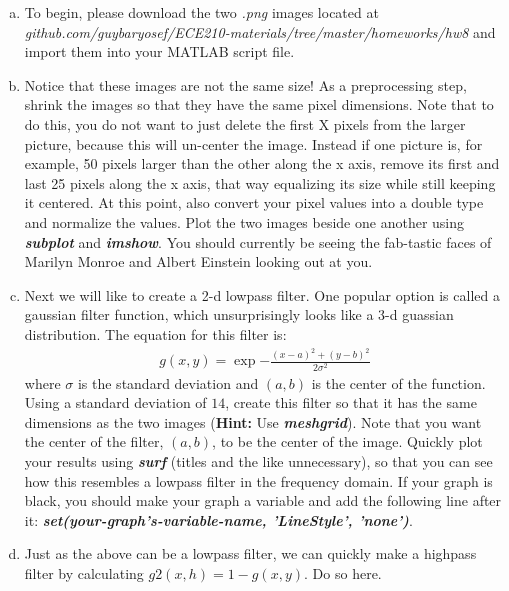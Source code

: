 \documentclass[11pt]{article}
\begin{document}
\begin{enumerate}[a.]
    \item To begin, please download the two \textit{.png} images located at
    \textit{github.com/guybaryosef/ECE210-materials/tree/master/homeworks/hw8}
    and import them into your MATLAB script file.

    \item Notice that these images are not the same size!
    As a preprocessing step, shrink the images so that they have the same
    pixel dimensions.
    Note that to do this, you do not want to just delete the first X pixels 
    from the larger picture, because this will un-center the image.
    Instead if one picture is, for example, 50 pixels larger than the other
    along the x axis, remove its first and last 25 pixels along the x axis,
    that way equalizing its size while still keeping it centered.
    At this point, also convert your pixel values into a double type and 
    normalize the values.
    Plot the two images beside one another using \textit{\textbf{subplot}}
    and \textit{\textbf{imshow}}.
    You should currently be seeing the fab-tastic faces of Marilyn Monroe and
    Albert Einstein looking out at you.

    \item Next we will like to create a 2-d lowpass filter.
    One popular option is called a gaussian filter function,
    which unsurprisingly looks like a 3-d guassian distribution.
    The equation for this filter is:
    \begin{align*}
        g(x,y) = \exp{-\frac{(x-a)^2 +(y-b)^2}{2\sigma^2}}
    \end{align*}
    where $\sigma$ is the standard deviation and $(a,b)$ is the center of the function.
    Using a standard deviation of $14$,
    create this filter so that it has the same dimensions as the two images
    (\textbf{Hint:} Use \textbf{\textit{meshgrid}}).
    Note that you want the center of the filter, $(a,b)$, to be the center of the image.
    Quickly plot your results using \textbf{\textit{surf}} (titles and the like unnecessary),
    so that you can see how this resembles a lowpass filter in the frequency domain.
    If your graph is black, you should make your graph a variable and add
    the following line after it:
    \textbf{\textit{set(your-graph's-variable-name, 'LineStyle', 'none')}}.

    \item Just as the above can be a lowpass filter, we can quickly make
    a highpass filter by calculating $g2(x,h) = 1 - g(x,y)$.
    Do so here.


\end{enumerate}
\end{document}

